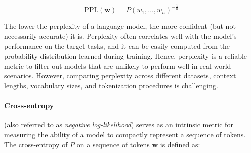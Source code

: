 \begin{equation}
    \text{PPL}(\bm{w}) = P(w_1, \ldots, w_n)^{-\frac{1}{n}}
\end{equation}

The lower the perplexity of a language model, the more confident (but not necessarily accurate) it is. Perplexity often correlates well with the model's performance on the target tasks, and it can be easily computed from the probability distribution learned during training. Hence, perplexity is a reliable metric to filter out models that are unlikely to perform well in real-world scenarios. However, comparing perplexity across different datasets, context lengths, vocabulary sizes, and tokenization procedures is challenging. 


\paragraph{Cross-entropy} (also referred to as \textit{negative log-likelihood}) serves as an intrinsic metric for measuring the ability of a model to compactly represent a sequence of tokens. The cross-entropy of $P$ on a sequence of tokens $\bm{w}$ is defined as:



